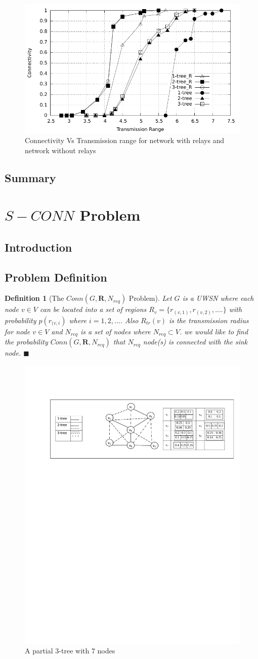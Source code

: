 \documentclass[12pt]{article}
\newtheorem*{defi}{Definition}
\begin{document}
\begin{figure}
\begin{minipage}{.9\linewidth}
\end{minipage}
\includegraphics[width=6 in, height=2.6 in]{NetworkI_woR.pdf}
\caption{Connectivity Vs Transmission range for network with relays and network without relays}
\label{Fig:NWOR}
\end{figure}
\subsection{Summary}
\section{ $S-CONN$ Problem}
\subsection{Introduction}
\subsection{Problem Definition}
\begin{defi}[The $Conn(G,\textbf{R},N_{req})$ Problem]
\normalfont
Let $G$ is a UWSN where each node $v\in V$ can be located into a set of regions  $R_v=\{r_{(v,1)},r_{(v,2)},....\}$  with probability $p(r_{(v,i})$ where $i=1,2,...$. Also $R_{tr}(v)$ is the transmission radius for node $v\in V$ and $N_{req}$ is a set of nodes where $N_{req}\subset V$. we would like to find the probability $Conn(G,\textbf{R},N_{req})$ that $N_{req}$ node(s) is connected with the sink node. $\blacksquare$
\end{defi}

\begin{figure}
\centering
\begin{minipage}{.9\linewidth}
\end{minipage}
\includegraphics[width=5.5 in, height=1.8 in]{NReq.pdf}
\caption{A partial $3$-tree with $7$ nodes}
\label{Fig:Nreq}
\end{figure}
\end{document}
